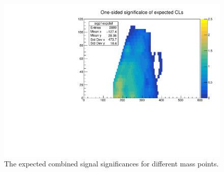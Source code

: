 \begin{figure}[htpb]
\centering
\includegraphics[width=0.5\linewidth]{data/plot/SR_redefinition/HF/sigp1expclsf_Dani_bVeto_unitscale.pdf}
\caption{The expected combined signal significances for different mass points.}
\label{fig:SR_expected_limit}
\end{figure}
